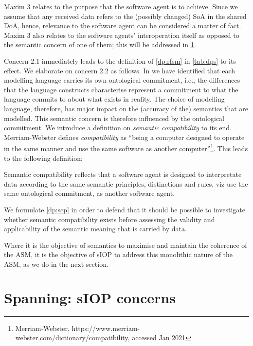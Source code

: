 \documentclass[sort&compress,preprint,authoryear,3p,twocolumn]{elsarticle}
\begin{document}
Maxim 3 relates to the purpose that the software agent is to achieve.
Since we assume that any received data refers to the (possibly changed)
SoA in the shared DoA, hence, relevance to the software agent can be
considered a matter of fact. Maxim 3 also relates to the software
agents' interoperation itself as opposed to the semantic concern of one
of them; this will be addressed in \cref{spanning-siop-concerns}.

Concern 2.1 immediately leads to the definition of \cref{dp:rfsm} in
\cref{tab:dps} to its effect. We elaborate on concern 2.2 as follows. In
\citep{Brandt2021a} we have identified that each modelling language
carries its own ontological commitment, i.e., the differences that the
language constructs characterise represent a commitment to what the
language commits to about what exists in reality. The choice of
modelling language, therefore, has major impact on the (accuracy of the)
semantics that are modelled. This semantic concern is therefore
influenced by the ontological commitment. We introduce a definition on
\emph{semantic compatibility} to its end. Merriam-Webster defines
\emph{compatibility} as ``being a computer designed to operate in the
same manner and use the same software as another computer''\footnote{Merriam-Webster,
  https://www.merriam-webster.com/dictionary/compatibility, accessed Jan
  2021}. This leads to the following definition:

\begin{mmdef}\label{def:semantic-compatibility}
Semantic compatibility reflects that a software agent is designed to interpretate data according to the same semantic principles, distinctions and rules, viz use the same ontological commitment, as another software agent. 
\end{mmdef}

We formulate \cref{dp:scp} in order to defend that it should be possible
to investigate whether semantic compatibility exists before assessing
the validity and applicability of the semantic meaning that is carried
by data.

Where it is the objective of semantics to maximise and maintain the
coherence of the ASM, it is the objective of sIOP to address this
monolithic nature of the ASM, as we do in the next section.

\hypertarget{spanning-siop-concerns}{%
\section{Spanning: sIOP concerns}\label{spanning-siop-concerns}}
\end{document}
